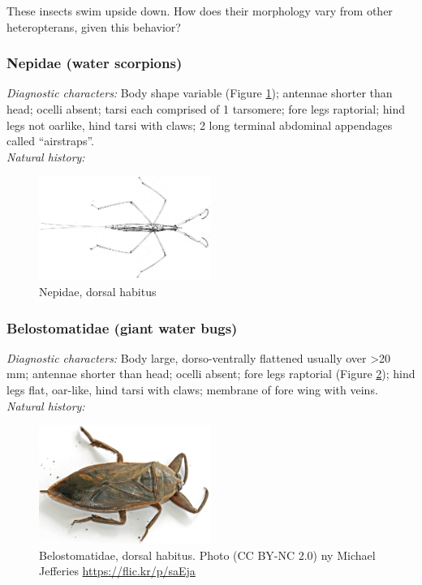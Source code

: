 \documentclass[letterpaper, 11pt]{article}
\begin{document}
\noindent{}These insects swim upside down. How does their morphology vary from other heteropterans, given this behavior?

\subsubsection{Nepidae (water scorpions)}
\noindent{}\textit{Diagnostic characters:} Body shape variable (Figure \ref{fig:nepid1}); antennae shorter than head; ocelli absent; tarsi each comprised of 1 tarsomere; fore legs raptorial; hind legs not oarlike, hind tarsi with claws; 2 long terminal abdominal appendages called ``airstraps''.\\

\noindent{}\textit{Natural history:} \\

\begin{figure}[ht!]
 \centering
 \includegraphics[width=0.5\textwidth]{NepidHabitus}
 \caption{Nepidae, dorsal habitus \citep[][Plate 7, Fig. 3]{bhl37902}}
 \label{fig:nepid1}
\end{figure}

\subsubsection{Belostomatidae (giant water bugs)}
\noindent{}\textit{Diagnostic characters:} Body large, dorso-ventrally flattened usually over \textgreater20 mm; antennae shorter than head; ocelli absent; fore legs raptorial (Figure \ref{fig:belostom1}); hind legs flat, oar-like, hind tarsi with claws; membrane of fore wing with veins.\\

\noindent{}\textit{Natural history:} \\

\begin{figure}[ht!]
 \centering
 \includegraphics[width=0.5\textwidth]{BelostomatidHabitus}
 \caption{Belostomatidae, dorsal habitus. Photo (CC BY-NC 2.0) ny Michael Jefferies \url{https://flic.kr/p/saEja}}
 \label{fig:belostom1}
\end{figure}
\end{document}
